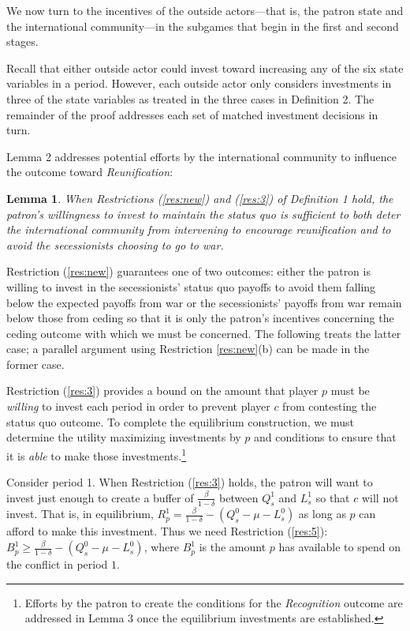 \documentclass[11pt,letterpaper, notitlepage]{article}
\newtheorem{lemma}{Lemma}
\newcommand{\de}{\delta}
\begin{document}
We now turn to the incentives of the outside actors---that is, the patron state and the international community---in the subgames that begin in the first and second stages.

Recall that either outside actor could invest toward increasing any of the six state variables in a period. However, each outside actor only considers investments in three of the state variables as treated in the three cases in Definition 2. The remainder of the proof addresses each set of matched investment decisions in turn.

Lemma 2 addresses potential efforts by the international community to influence the outcome toward \emph{Reunification}:

\begin{lemma}
When Restrictions (\ref{res:new}) and (\ref{res:3}) of Definition 1 hold, the patron's willingness to invest to maintain the status quo is sufficient to both deter the international community from intervening to encourage reunification and to avoid the secessionists choosing to go to war.
\end{lemma}

\noindent Restriction (\ref{res:new}) guarantees one of two outcomes: either the patron is willing to invest in the secessionists' status quo payoffs to avoid them falling below the expected payoffs from war or the secessionists' payoffs from war remain below those from ceding so that it is only the patron's incentives concerning the ceding outcome with which we must be concerned. The following treats the latter case; a parallel argument using Restriction \ref{res:new}(b) can be made in the former case.

Restriction (\ref{res:3}) provides a bound on the amount that player $p$ must be \emph{willing} to invest each period in order to prevent player $c$ from contesting the status quo outcome. To complete the equilibrium construction, we must determine the utility maximizing investments by $p$ and conditions to ensure that it is \emph{able} to make those investments.\footnote{Efforts by the patron to create the conditions for the \emph{Recognition} outcome are addressed in Lemma 3 once the equilibrium investments are established.}

Consider period 1. When Restriction (\ref{res:3}) holds, the patron will want to invest just enough to create a buffer of $\frac{\beta}{1-\de}$ between $Q_s^1$ and $L_s^1$ so that $c$ will not invest. That is, in equilibrium, $R_p^1 = \frac{\beta}{1-\de} -(Q_s^0 - \mu - L_s^0)$ as long as $p$ can afford to make this investment. Thus we need Restriction (\ref{res:5}): $B_p^1 \geq\frac{\beta}{1-\de} - \left(Q_s^0 - \mu - L_s^0 \right)$, where $B_p^1$ is the amount $p$ has available to spend on the conflict in period $1$.
\end{document}

